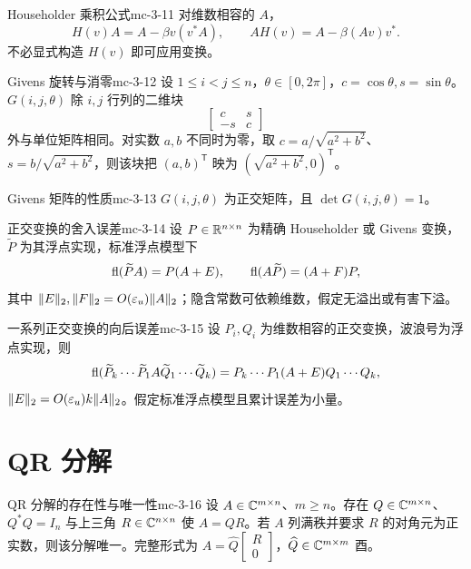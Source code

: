 \begin{proposition}{Householder 乘积公式}{mc-3-11}
对维数相容的 $A$，
\[H(v)A=A-\beta v(v^*A),\qquad AH(v)=A-\beta(Av)v^*.\]
不必显式构造 $H(v)$ 即可应用变换。
\end{proposition}

\begin{definition}{Givens 旋转与消零}{mc-3-12}
设 $1\leq i<j\leq n$，$\theta\in[0,2\pi]$，$c=\cos\theta,s=\sin\theta$。$G(i,j,\theta)$ 除 $i,j$ 行列的二维块
\[\begin{bmatrix}c&s\\-s&c\end{bmatrix}\]
外与单位矩阵相同。对实数 $a,b$ 不同时为零，取 $c=a/\sqrt{a^2+b^2}$、$s=b/\sqrt{a^2+b^2}$，则该块把 $(a,b)^{\mathsf T}$ 映为 $(\sqrt{a^2+b^2},0)^{\mathsf T}$。
\end{definition}

\begin{theorem}{Givens 矩阵的性质}{mc-3-13}
$G(i,j,\theta)$ 为正交矩阵，且 $\det G(i,j,\theta)=1$。
\end{theorem}

\begin{lemma}{正交变换的舍入误差}{mc-3-14}
设 $P\in\mathbb{R}^{n\times n}$ 为精确 Householder 或 Givens 变换，$\widetilde P$ 为其浮点实现，标准浮点模型下
\[\operatorname{fl}(\widetilde PA)=P(A+E),\qquad\operatorname{fl}(A\widetilde P)=(A+F)P,\]
其中 $\|E\|_2,\|F\|_2=O(\varepsilon_u)\|A\|_2$；隐含常数可依赖维数，假定无溢出或有害下溢。
\end{lemma}

\begin{theorem}{一系列正交变换的向后误差}{mc-3-15}
设 $P_i,Q_i$ 为维数相容的正交变换，波浪号为浮点实现，则
\[\operatorname{fl}(\widetilde P_k\cdots\widetilde P_1A\widetilde Q_1\cdots\widetilde Q_k)
=P_k\cdots P_1(A+E)Q_1\cdots Q_k,\]
$\|E\|_2=O(\varepsilon_u)k\|A\|_2$。假定标准浮点模型且累计误差为小量。
\end{theorem}

\section{QR 分解}

\begin{theorem}{QR 分解的存在性与唯一性}{mc-3-16}
设 $A\in\mathbb{C}^{m\times n}$、$m\geq n$。存在 $Q\in\mathbb{C}^{m\times n}$、$Q^*Q=I_n$ 与上三角 $R\in\mathbb{C}^{n\times n}$ 使 $A=QR$。若 $A$ 列满秩并要求 $R$ 的对角元为正实数，则该分解唯一。完整形式为 $A=\widehat Q\begin{bmatrix}R\\0\end{bmatrix}$，$\widehat Q\in\mathbb{C}^{m\times m}$ 酉。
\end{theorem}

